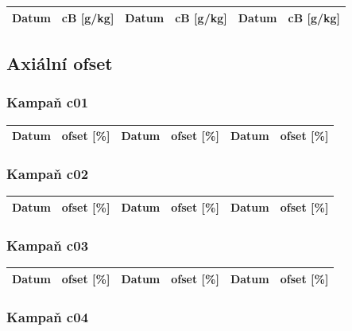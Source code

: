 \documentclass[a4paper,twoside,11pt]{article}
\begin{document}
\begin{tabular}{|l|l||l|l||l|l|}
\hline
Datum & cB [g/kg] & Datum & cB [g/kg] & Datum & cB [g/kg] \\
\hline

\end{tabular}



\subsection{Axiální ofset}





\subsubsection{Kampaň c01}

\begin{tabular}{|l|l||l|l||l|l|}
\hline
Datum & ofset [\%] & Datum & ofset [\%] & Datum & ofset [\%]\\
\hline

\end{tabular}





\subsubsection{Kampaň c02}

\begin{tabular}{|l|l||l|l||l|l|}
\hline
Datum & ofset [\%] & Datum & ofset [\%] & Datum & ofset [\%]\\
\hline

\end{tabular}





\subsubsection{Kampaň c03}

\begin{tabular}{|l|l||l|l||l|l|}
\hline
Datum & ofset [\%] & Datum & ofset [\%] & Datum & ofset [\%]\\
\hline

\end{tabular}





\subsubsection{Kampaň c04}
\end{document}
